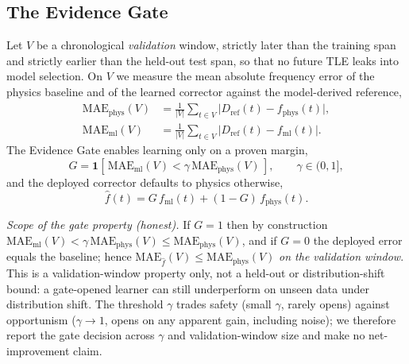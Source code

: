 \documentclass[conference]{IEEEtran}
\begin{document}
\subsection{The Evidence Gate}
\label{sec:gate}
Let $V$ be a chronological \emph{validation} window, strictly later than the
training span and strictly earlier than the held-out test span, so that no future
TLE leaks into model selection. On $V$ we measure the mean absolute frequency
error of the physics baseline and of the learned corrector against the
model-derived reference,
\begin{align}
\mathrm{MAE}_{\mathrm{phys}}(V) &= \tfrac{1}{|V|}\textstyle\sum_{t\in V}\big|D_{\mathrm{ref}}(t)-f_{\mathrm{phys}}(t)\big|,\\
\mathrm{MAE}_{\mathrm{ml}}(V)   &= \tfrac{1}{|V|}\textstyle\sum_{t\in V}\big|D_{\mathrm{ref}}(t)-f_{\mathrm{ml}}(t)\big|.
\end{align}
The Evidence Gate enables learning only on a proven margin,
\begin{equation}
G = \mathbf{1}\!\left[\,\mathrm{MAE}_{\mathrm{ml}}(V) < \gamma\,\mathrm{MAE}_{\mathrm{phys}}(V)\,\right],
\qquad \gamma\in(0,1],
\label{eq:gate}
\end{equation}
and the deployed corrector defaults to physics otherwise,
\begin{equation}
\hat f(t) = G\,f_{\mathrm{ml}}(t) + (1-G)\,f_{\mathrm{phys}}(t).
\label{eq:deploy}
\end{equation}

\emph{Scope of the gate property (honest).} If $G=1$ then by construction
$\mathrm{MAE}_{\mathrm{ml}}(V) < \gamma\,\mathrm{MAE}_{\mathrm{phys}}(V) \le
\mathrm{MAE}_{\mathrm{phys}}(V)$, and if $G=0$ the deployed error equals the
baseline; hence $\mathrm{MAE}_{\hat f}(V)\le \mathrm{MAE}_{\mathrm{phys}}(V)$
\emph{on the validation window}. This is a validation-window property only, not a
held-out or distribution-shift bound: a gate-opened learner can still underperform
on unseen data under distribution shift. The threshold $\gamma$ trades safety
(small $\gamma$, rarely opens) against opportunism ($\gamma\!\to\!1$, opens on any
apparent gain, including noise); we therefore report the gate decision across
$\gamma$ and validation-window size and make no net-improvement claim.
\end{document}
